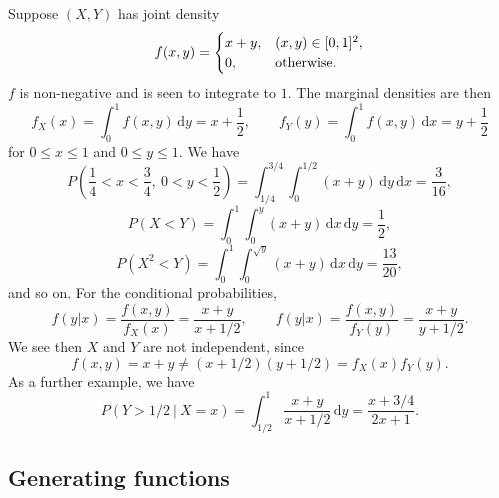 \documentclass[letter-paper]{tufte-book}
\newenvironment{example}[1][Example]{\begin{trivlist}
\item[\hskip \labelsep {\bfseries #1}]}{\end{trivlist}}
\begin{document}
\begin{example}
  Suppose $(X,Y)$ has joint density
  \begin{equation*}
    f(x,y) =
      \begin{cases}
        x+y, & (x,y)\in[0,1]^2,\\
        0, & \textnormal{otherwise}.
      \end{cases}
  \end{equation*}
  $f$ is non-negative and is seen to integrate to $1$. The marginal densities
  are then
  \begin{equation*}
    f_X(x) = \int_0^1 f(x,y)\, \mathrm{d}y = x+\frac{1}{2},\qquad
    f_Y(y) = \int_0^1 f(x,y)\, \mathrm{d}x = y+\frac{1}{2}
  \end{equation*}
  for $0 \leq x \leq 1$ and $0 \leq y \leq 1$. We have
  \begin{equation*}
    P\left(\frac{1}{4}<x<\frac{3}{4},\ 0<y<\frac{1}{2}\right) =
    \int_{1/4}^{3/4} \int_0^{1/2} (x+y)\, \mathrm{d}y\, \mathrm{d}x
    =\frac{3}{16},
  \end{equation*}
  \begin{equation*}
    P(X<Y) = \int_0^1 \int_0^y (x+y)\, \mathrm{d}x\, \mathrm{d}y = \frac{1}{2},
  \end{equation*}
  \begin{equation*}
    P(X^2<Y) = \int_0^1 \int_0^{\sqrt{y}} (x+y)\, \mathrm{d}x\, \mathrm{d}y
     = \frac{13}{20},
  \end{equation*}
  and so on. For the conditional probabilities,
  \begin{equation*}
    f(y|x) = \frac{f(x,y)}{f_X(x)} = \frac{x+y}{x+1/2},\qquad
      f(y|x) = \frac{f(x,y)}{f_Y(y)} = \frac{x+y}{y+1/2}.
  \end{equation*}
  We see then $X$ and $Y$ are not independent, since
  \begin{equation*}
    f(x,y) = x+y \neq (x+1/2)(y+1/2) = f_X(x) f_Y(y).
  \end{equation*}
  As a further example, we have
  \begin{equation*}
    P(Y>1/2\ |\ X=x) = \int_{1/2}^1 \frac{x+y}{x+1/2}\, \mathrm{d}y
    = \frac{x+3/4}{2x+1}.
  \end{equation*}
\end{example}


\subsection{Generating functions}
\end{document}
